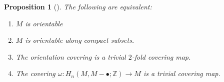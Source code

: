 \documentclass[reqno]{amsart}
\newtheorem{proposition}[theorem]{Proposition}
\theoremstyle{definition}
\theoremstyle{remark}
\begin{document}
\begin{proposition}[]\label{Prop:UBCKW}
    The following are equivalent:


    \begin{enumerate}
        \item $M$ is orientable
        \item $M$ is orientable along compact subsets.
        \item The orientation covering is a trivial 
            $2$-fold covering map.
        \item The covering $\omega \colon
            H_n(M, M - \bullet ; \mathbb{Z}) \to M$ is
            a trivial covering map.
    \end{enumerate}

\end{proposition}
\end{document}
